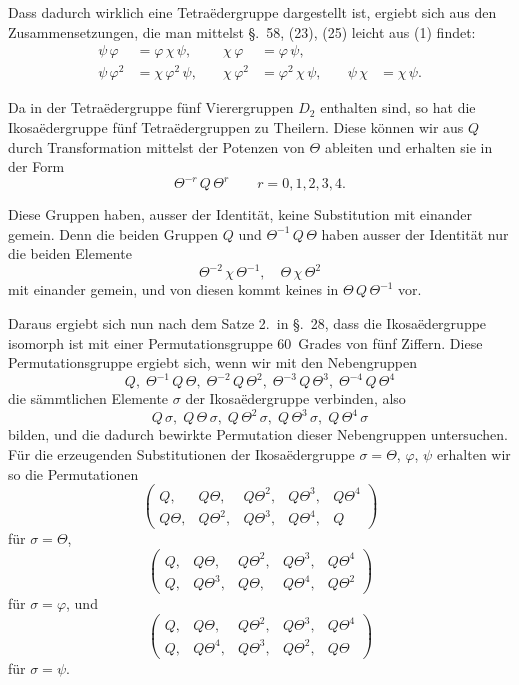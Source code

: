 \documentclass[12pt,a4paper]{article}
\theoremstyle{plain}
\theoremstyle{definition}
\theoremstyle{remark}
\begin{document}
Dass dadurch wirklich eine Tetra\"edergruppe dargestellt ist, ergiebt sich aus den Zusammensetzungen, die man mittelst \S.~58, (23), (25) leicht aus (1) findet:
\begin{equation}\tag{5}
\begin{aligned}
\psi\,\varphi &= \varphi\,\chi\,\psi,\quad & \chi\,\varphi &= \varphi\,\psi, \\
\psi\,\varphi^{2} &= \chi\,\varphi^{2}\,\psi,\quad & \chi\,\varphi^{2} &= \varphi^{2}\,\chi\,\psi,\quad & \psi\,\chi &= \chi\,\psi.
\end{aligned}
\end{equation}

Da in der Tetra\"edergruppe f\"unf Vierergruppen $D_{2}$ enthalten sind, so hat die Ikosa\"edergruppe f\"unf Tetra\"edergruppen zu Theilern. Diese k\"onnen wir aus $Q$ durch Transformation mittelst der Potenzen von $\Theta$ ableiten und erhalten sie in der Form
\[
\Theta^{-r}\,Q\,\Theta^{r}\qquad r = 0, 1, 2, 3, 4.
\]

Diese Gruppen haben, ausser der Identit\"at, keine Substitution mit einander gemein. Denn die beiden Gruppen $Q$ und $\Theta^{-1}\,Q\,\Theta$ haben ausser der Identit\"at nur die beiden Elemente
\[
\Theta^{-2}\,\chi\,\Theta^{-1},\quad \Theta\,\chi\,\Theta^{2}
\]
mit einander gemein, und von diesen kommt keines in $\Theta\,Q\,\Theta^{-1}$ vor.

Daraus ergiebt sich nun nach dem Satze 2.~in \S.~28, dass die Ikosa\"edergruppe isomorph ist mit einer Permutationsgruppe 60~Grades von f\"unf Ziffern. Diese Permutationsgruppe ergiebt sich, wenn wir mit den Nebengruppen
\[
Q,\; \Theta^{-1}\,Q\,\Theta,\; \Theta^{-2}\,Q\,\Theta^{2},\; \Theta^{-3}\,Q\,\Theta^{3},\; \Theta^{-4}\,Q\,\Theta^{4}
\]
die s\"ammtlichen Elemente $\sigma$ der Ikosa\"edergruppe verbinden, also
\[
Q\,\sigma,\; Q\,\Theta\,\sigma,\; Q\,\Theta^{2}\,\sigma,\; Q\,\Theta^{3}\,\sigma,\; Q\,\Theta^{4}\,\sigma
\]
bilden, und die dadurch bewirkte Permutation dieser Nebengruppen untersuchen. F\"ur die erzeugenden Substitutionen der Ikosa\"edergruppe $\sigma = \Theta$, $\varphi$, $\psi$ erhalten wir so die Permutationen
\[
\begin{pmatrix} Q, & Q\Theta, & Q\Theta^{2}, & Q\Theta^{3}, & Q\Theta^{4} \\ Q\Theta, & Q\Theta^{2}, & Q\Theta^{3}, & Q\Theta^{4}, & Q \end{pmatrix}
\]
f\"ur $\sigma = \Theta$,
\[
\begin{pmatrix} Q, & Q\Theta, & Q\Theta^{2}, & Q\Theta^{3}, & Q\Theta^{4} \\ Q, & Q\Theta^{3}, & Q\Theta, & Q\Theta^{4}, & Q\Theta^{2} \end{pmatrix}
\]
f\"ur $\sigma = \varphi$, und
\[
\begin{pmatrix} Q, & Q\Theta, & Q\Theta^{2}, & Q\Theta^{3}, & Q\Theta^{4} \\ Q, & Q\Theta^{4}, & Q\Theta^{3}, & Q\Theta^{2}, & Q\Theta \end{pmatrix}
\]
f\"ur $\sigma = \psi$.
\end{document}

